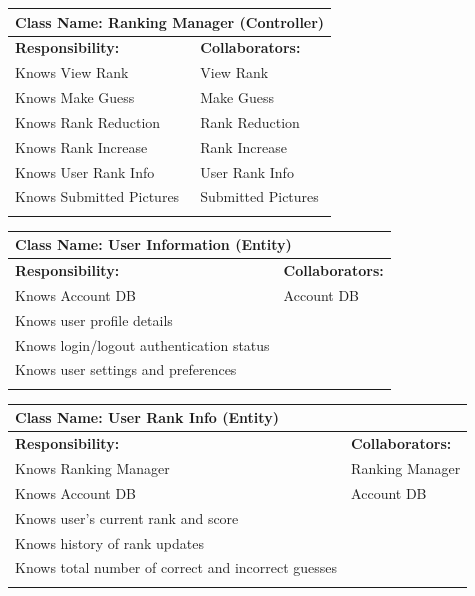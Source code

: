 \documentclass[]{article}
\begin{document}
	\begin{table}[H]
		\centering
		\begin{tabular}{|p{8cm}|p{8cm}|}
		\hline 
		 \multicolumn{2}{|l|}{\textbf{Class Name:} Ranking Manager (Controller)} \\
		\hline
		\textbf{Responsibility:} & \textbf{Collaborators:} \\
		\hline
		Knows View Rank & View Rank \\
		Knows Make Guess & Make Guess \\
		Knows Rank Reduction & Rank Reduction \\
		Knows Rank Increase & Rank Increase \\
		Knows User Rank Info & User Rank Info \\
		Knows Submitted Pictures & Submitted Pictures \\
		\vspace{1in} & \\
		\hline
		\end{tabular}
	\end{table}

	\begin{table}[H]
		\centering
		\begin{tabular}{|p{8cm}|p{8cm}|}
		\hline 
		 \multicolumn{2}{|l|}{\textbf{Class Name:} User Information (Entity)} \\
		\hline
		\textbf{Responsibility:} & \textbf{Collaborators:} \\
		\hline
		Knows Account DB & Account DB \\
		Knows user profile details & \\
		Knows login/logout authentication status & \\
		Knows user settings and preferences & \\
		\vspace{1in} & \\
		\hline
		\end{tabular}
	\end{table}

	\begin{table}[H]
		\centering
		\begin{tabular}{|p{8cm}|p{8cm}|}
		\hline 
		 \multicolumn{2}{|l|}{\textbf{Class Name:} User Rank Info (Entity)} \\
		\hline
		\textbf{Responsibility:} & \textbf{Collaborators:} \\
		\hline
		Knows Ranking Manager & Ranking Manager \\
		Knows Account DB & Account DB \\
		Knows user's current rank and score & \\
		Knows history of rank updates & \\
		Knows total number of correct and incorrect guesses & \\
		\vspace{1in} & \\
		\hline
		\end{tabular}
	\end{table}
\end{document}
